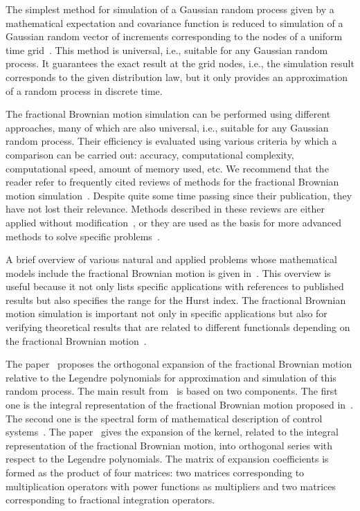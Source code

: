 \documentclass[10pt,reqno]{amsart}
\theoremstyle{plain}
\theoremstyle{remark}
\begin{document}
The simplest method for simulation of a Gaussian random process given by a mathematical expectation and covariance function is reduced to simulation of a Gaussian random vector of increments corresponding to the nodes of a uniform time grid~\cite{MihVoi_06, Law_21}. This method is universal, i.e., suitable for any Gaussian random process. It guarantees the exact result at the grid nodes, i.e., the simulation result corresponds to the given distribution law, but it only provides an approximation of a random process in discrete time.

The fractional Brownian motion simulation can be performed using different approaches, many of which are also universal, i.e., suitable for any Gaussian random process. Their efficiency is evaluated using various criteria by which a comparison can be carried out: accuracy, computational complexity, computational speed, amount of memory used, etc. We recommend that the reader refer to frequently cited reviews of methods for the fractional Brownian motion simulation~\cite{Coe_JSS00, Die_MS02, DieMan_PEIS03, KijTam_13}. Despite quite some time passing since their publication, they have not lost their relevance. Methods described in these reviews are either applied without modification~\cite{VarBul_SPL15, CreMarMus_FF22, RegDolBen_NC23}, or they are used as the basis for more advanced methods to solve specific problems~\cite{WalWie_PRE20}.

A brief overview of various natural and applied problems whose mathematical models include the fractional Brownian motion is given in~\cite{AruWalWie_PRE20}. This overview is useful because it not only lists specific applications with references to published results but also specifies the range for the Hurst index. The fractional Brownian motion simulation is important not only in specific applications but also for verifying theoretical results that are related to different functionals depending on the fractional Brownian motion~\cite{SadWie_PRE21, KimAki_PRE22}.

The paper~\cite{Ryb_Comp25} proposes the orthogonal expansion of the fractional Brownian motion relative to the Legendre polynomials for approximation and simulation of this random process. The main result from~\cite{Ryb_Comp25} is based on two components. The first one is the integral representation of the fractional Brownian motion proposed in~\cite{DecUst_PA99}. The second one is the spectral form of mathematical description of control systems~\cite{SolSemPeshNed_79, RybSot_TAC07}. The paper~\cite{Ryb_Comp25} gives the expansion of the kernel, related to the integral representation of the fractional Brownian motion, into orthogonal series with respect to the Legendre polynomials. The matrix of expansion coefficients is formed as the product of four matrices: two matrices corresponding to multiplication operators with power functions as multipliers and two matrices corresponding to fractional integration operators.
\end{document}
